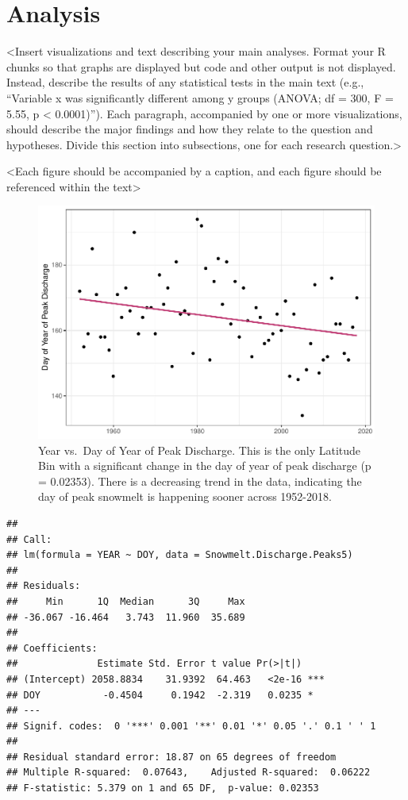 \documentclass[12pt,]{article}
\begin{document}
\hypertarget{analysis}{%
\section{Analysis}\label{analysis}}

\textless{}Insert visualizations and text describing your main analyses.
Format your R chunks so that graphs are displayed but code and other
output is not displayed. Instead, describe the results of any
statistical tests in the main text (e.g., ``Variable x was significantly
different among y groups (ANOVA; df = 300, F = 5.55, p \textless{}
0.0001)''). Each paragraph, accompanied by one or more visualizations,
should describe the major findings and how they relate to the question
and hypotheses. Divide this section into subsections, one for each
research question.\textgreater{}

\textless{}Each figure should be accompanied by a caption, and each
figure should be referenced within the text\textgreater{}

\begin{figure}
\centering
\includegraphics{Project_Report_v2_files/figure-latex/unnamed-chunk-9-1.pdf}
\caption{Year vs.~Day of Year of Peak Discharge. This is the only
Latitude Bin with a significant change in the day of year of peak
discharge (p = 0.02353). There is a decreasing trend in the data,
indicating the day of peak snowmelt is happening sooner across
1952-2018.}
\end{figure}

\begin{verbatim}
## 
## Call:
## lm(formula = YEAR ~ DOY, data = Snowmelt.Discharge.Peaks5)
## 
## Residuals:
##     Min      1Q  Median      3Q     Max 
## -36.067 -16.464   3.743  11.960  35.689 
## 
## Coefficients:
##              Estimate Std. Error t value Pr(>|t|)    
## (Intercept) 2058.8834    31.9392  64.463   <2e-16 ***
## DOY           -0.4504     0.1942  -2.319   0.0235 *  
## ---
## Signif. codes:  0 '***' 0.001 '**' 0.01 '*' 0.05 '.' 0.1 ' ' 1
## 
## Residual standard error: 18.87 on 65 degrees of freedom
## Multiple R-squared:  0.07643,    Adjusted R-squared:  0.06222 
## F-statistic: 5.379 on 1 and 65 DF,  p-value: 0.02353
\end{verbatim}
\end{document}
